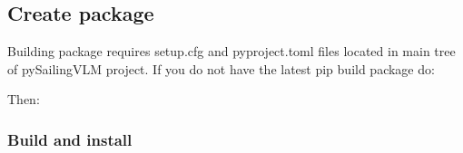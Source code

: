 \documentclass[letterpaper,10pt,english]{jupyterBook}
\begin{document}
\begin{sphinxVerbatim}[commandchars=\\\{\}]
    
\end{sphinxVerbatim}


\subsection{Create package}
\label{\detokenize{chapters/start/installation:create-package}}
\sphinxAtStartPar
Building package requires setup.cfg and pyproject.toml files located in main tree of pySailingVLM project. If you do not have the latest pip build package do:

\begin{sphinxVerbatim}[commandchars=\\\{\}]
   
\end{sphinxVerbatim}

\sphinxAtStartPar
Then:

\begin{sphinxVerbatim}[commandchars=\\\{\}]
  
\end{sphinxVerbatim}


\subsubsection{Build and install}
\label{\detokenize{chapters/start/installation:build-and-install}}
\begin{sphinxVerbatim}[commandchars=\\\{\}]
  
\end{sphinxVerbatim}

\begin{sphinxVerbatim}[commandchars=\\\{\}]
  
\end{sphinxVerbatim}

\sphinxstepscope
\end{document}

